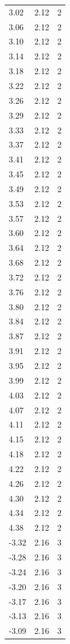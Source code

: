 \begin{longtable}{lrr}
  3.02 & 2.12 & 2 \\
  3.06 & 2.12 & 2 \\
  3.10 & 2.12 & 2 \\
  3.14 & 2.12 & 2 \\
  3.18 & 2.12 & 2 \\
  3.22 & 2.12 & 2 \\
  3.26 & 2.12 & 2 \\
  3.29 & 2.12 & 2 \\
  3.33 & 2.12 & 2 \\
  3.37 & 2.12 & 2 \\
  3.41 & 2.12 & 2 \\
  3.45 & 2.12 & 2 \\
  3.49 & 2.12 & 2 \\
  3.53 & 2.12 & 2 \\
  3.57 & 2.12 & 2 \\
  3.60 & 2.12 & 2 \\
  3.64 & 2.12 & 2 \\
  3.68 & 2.12 & 2 \\
  3.72 & 2.12 & 2 \\
  3.76 & 2.12 & 2 \\
  3.80 & 2.12 & 2 \\
  3.84 & 2.12 & 2 \\
  3.87 & 2.12 & 2 \\
  3.91 & 2.12 & 2 \\
  3.95 & 2.12 & 2 \\
  3.99 & 2.12 & 2 \\
  4.03 & 2.12 & 2 \\
  4.07 & 2.12 & 2 \\
  4.11 & 2.12 & 2 \\
  4.15 & 2.12 & 2 \\
  4.18 & 2.12 & 2 \\
  4.22 & 2.12 & 2 \\
  4.26 & 2.12 & 2 \\
  4.30 & 2.12 & 2 \\
  4.34 & 2.12 & 2 \\
  4.38 & 2.12 & 2 \\
  -3.32 & 2.16 & 3 \\
  -3.28 & 2.16 & 3 \\
  -3.24 & 2.16 & 3 \\
  -3.20 & 2.16 & 3 \\
  -3.17 & 2.16 & 3 \\
  -3.13 & 2.16 & 3 \\
  -3.09 & 2.16 & 3 \\

\end{longtable}
